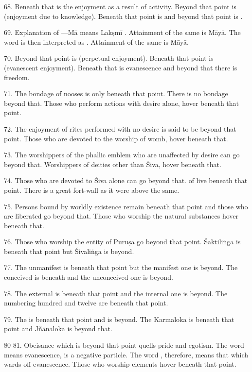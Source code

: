 68. Beneath that is the  enjoyment as a result of activity.
Beyond that point is  (enjoyment due to knowledge). Beneath that
point is  and beyond that point is .

69. Explanation of —Mā means Lakṣmī \ie {}. Attainment
of the same is Māyā. The word  is then interpreted as .
Attainment of the same is Māyā.

70. Beyond that point is  (perpetual enjoyment). Beneath that
point is  (evanescent enjoyment). Beneath that is evanescence
and beyond that there is freedom.

71. The bondage of nooses is only beneath that point. There is no bondage beyond
that. Those who perform actions with desire alone, hover beneath that point.

72. The enjoyment of rites performed with no desire is said to be beyond that
point. Those who are devoted to the worship of womb, hover beneath that.

73. The worshippers of the phallic emblem who are unaffected by desire can go
beyond that. Worshippers of deities other than Śiva, hover beneath that.

74. Those who are devoted to Śiva alone can go beyond that.  of
 live beneath that point. There is a great fort-wall as it were above
the same.

75. Persons bound by worldly existence remain beneath that point and those who
are liberated go beyond that. Those who worship the natural substances hover
beneath that.

76. Those who worship the entity of Puruṣa go beyond that point. Śaktiliṅga is
beneath that point but Śivaliṅga is beyond.

77. The unmanifest  is beneath that point but the manifest one is
beyond. The conceived  is beneath and the unconceived one is beyond.

78. The external  is beneath that point and the internal one is beyond.
The  numbering hundred and twelve are beneath that point.

79. The  is beneath that point and  is beyond.
The Karmaloka is beneath that point and Jñānaloka is beyond that.

80-81. Obeisance which is beyond that point quells pride and egotism. The word
 means evanescence,  is a negative particle. The word ,
therefore, means that which wards off evanescence. Those who worship elements
hover beneath that point.

